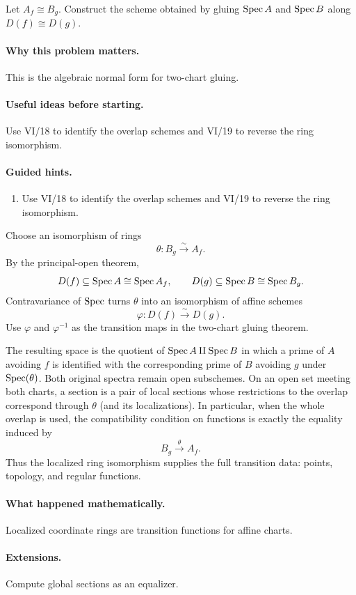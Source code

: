 \begin{problem}\label{prob:vi20-p06}
Let $A_f\cong B_g$. Construct the scheme obtained by gluing $\operatorname{Spec} A$ and $\operatorname{Spec} B$ along $D(f)\cong D(g)$.
\end{problem}

\ifdefined\FullProblemDossiers
\paragraph{Why this problem matters.}
This is the algebraic normal form for two-chart gluing.

\paragraph{Useful ideas before starting.}
Use VI/18 to identify the overlap schemes and VI/19 to reverse the ring isomorphism.

\paragraph{Guided hints.}
\begin{enumerate}
\item Use VI/18 to identify the overlap schemes and VI/19 to reverse the ring isomorphism.
\end{enumerate}

\begin{solution}
Choose an isomorphism of rings
\[
\theta:B_g\xrightarrow{\sim}A_f.
\]
By the principal-open theorem,
\[
D(f)\subseteq\operatorname{Spec} A\cong\operatorname{Spec} A_f,
\qquad
D(g)\subseteq\operatorname{Spec} B\cong\operatorname{Spec} B_g.
\]
Contravariance of $\operatorname{Spec}$ turns $\theta$ into an isomorphism of affine schemes
\[
\varphi:D(f)\xrightarrow{\sim}D(g).
\]
Use $\varphi$ and $\varphi^{-1}$ as the transition maps in the two-chart gluing theorem.

The resulting space is the quotient of $\operatorname{Spec} A\amalg\operatorname{Spec} B$ in which a prime of $A$ avoiding $f$ is identified with the corresponding prime of $B$ avoiding $g$ under $\operatorname{Spec}(\theta)$.  Both original spectra remain open subschemes.  On an open set meeting both charts, a section is a pair of local sections whose restrictions to the overlap correspond through $\theta$ (and its localizations).  In particular, when the whole overlap is used, the compatibility condition on functions is exactly the equality induced by
\[
B_g\xrightarrow{\theta}A_f.
\]
Thus the localized ring isomorphism supplies the full transition data: points, topology, and regular functions.
\end{solution}


\paragraph{What happened mathematically.}
Localized coordinate rings are transition functions for affine charts.

\paragraph{Extensions.}
Compute global sections as an equalizer.
\fi
